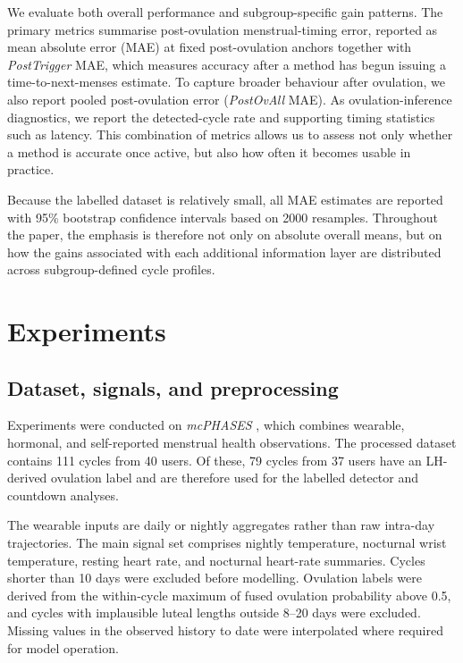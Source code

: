 \documentclass[conference]{IEEEtran}
\begin{document}
We evaluate both overall performance and subgroup-specific gain patterns. The primary metrics summarise post-ovulation menstrual-timing error, reported as mean absolute error (MAE) at fixed post-ovulation anchors together with \textit{PostTrigger} MAE, which measures accuracy after a method has begun issuing a time-to-next-menses estimate. To capture broader behaviour after ovulation, we also report pooled post-ovulation error (\textit{PostOvAll} MAE). As ovulation-inference diagnostics, we report the detected-cycle rate and supporting timing statistics such as latency. This combination of metrics allows us to assess not only whether a method is accurate once active, but also how often it becomes usable in practice.

Because the labelled dataset is relatively small, all MAE estimates are reported with 95\% bootstrap confidence intervals based on 2000 resamples. Throughout the paper, the emphasis is therefore not only on absolute overall means, but on how the gains associated with each additional information layer are distributed across subgroup-defined cycle profiles.

\section{Experiments}

\subsection{Dataset, signals, and preprocessing}

Experiments were conducted on \textit{mcPHASES} \cite{lin2025mcphases}, which combines wearable, hormonal, and self-reported menstrual health observations. The processed dataset contains 111 cycles from 40 users. Of these, 79 cycles from 37 users have an LH-derived ovulation label and are therefore used for the labelled detector and countdown analyses.

The wearable inputs are daily or nightly aggregates rather than raw intra-day trajectories. The main signal set comprises nightly temperature, nocturnal wrist temperature, resting heart rate, and nocturnal heart-rate summaries. Cycles shorter than 10 days were excluded before modelling. Ovulation labels were derived from the within-cycle maximum of fused ovulation probability above 0.5, and cycles with implausible luteal lengths outside 8--20 days were excluded. Missing values in the observed history to date were interpolated where required for model operation.
\end{document}
